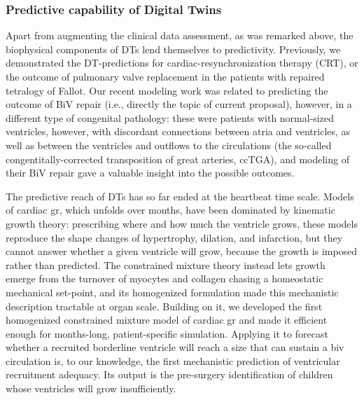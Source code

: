 \subsubsection{Predictive capability of Digital Twins}
Apart from augmenting the clinical data assessment, as was remarked above, the biophysical components of DTs lend themselves to predictivity. Previously, we demonstrated the DT-predictions for cardiac-resynchronization therapy (CRT),\cite{sermesant12} or the outcome of pulmonary valve replacement in the patients with repaired tetralogy of Fallot\cite{gusseva21a}. Our recent modeling work\cite{gusseva25} was related to predicting the outcome of BiV repair (i.e., directly the topic of current proposal), however, in a different type of congenital pathology: these were patients with normal-sized ventricles, however, with discordant connections between atria and ventricles, as well as between the ventricles and outflows to the circulations (the so-called congentitally-corrected transposition of great arteries, ccTGA), and modeling of their BiV repair %
gave a valuable insight into the possible outcomes.  

The predictive reach of DTs has so far ended at the heartbeat time scale. Models of cardiac \gls*{gr}, which unfolds over months, have been dominated by kinematic growth theory\cite{rodriguez94}: prescribing where and how much the ventricle grows, these models reproduce the shape changes of hypertrophy, dilation, and infarction\cite{goktepe10,costabal19,saez15}, but they cannot answer whether a given ventricle will grow, because the growth is imposed rather than predicted. The constrained mixture theory\cite{humphrey02a} instead lets growth emerge from the turnover of myocytes and collagen chasing a homeostatic mechanical set-point, and its homogenized formulation\cite{cyron16,braeu16} made this mechanistic description tractable at organ scale. Building on it, we developed the first homogenized constrained mixture model of cardiac \gls*{gr}\cite{gebauer23} and made it efficient enough for months-long, patient-specific simulation\cite{gebauer24}. Applying it to forecast whether a recruited borderline ventricle will reach a size that can sustain a \gls*{biv} circulation is, to our knowledge, the first mechanistic prediction of ventricular recruitment adequacy. Its output is the pre-surgery identification of children whose ventricles will grow insufficiently.

